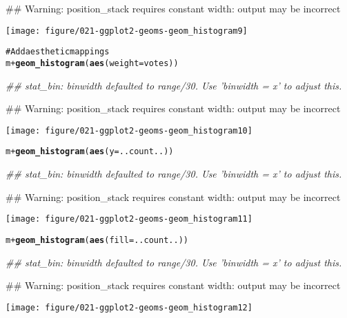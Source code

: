\documentclass[a4paper,titlepage]{tufte-handout}\usepackage{graphicx, color}
\makeatletter
\def\maxwidth{ %
  \ifdim\Gin@nat@width>\linewidth
    \linewidth
  \else
    \Gin@nat@width
  \fi
}
\newcommand{\hlfunctioncall}[1]{\textcolor[rgb]{0.501960784313725,0,0.329411764705882}{\textbf{#1}}}%
\newcommand{\hlcomment}[1]{\textcolor[rgb]{0.180392156862745,0.6,0.341176470588235}{#1}}%
\newenvironment{kframe}{%
 \def\at@end@of@kframe{}%
 \ifinner\ifhmode%
  \def\at@end@of@kframe{\end{minipage}}%
  \begin{minipage}{\columnwidth}%
 \fi\fi%
 \def\FrameCommand##1{\hskip\@totalleftmargin \hskip-\fboxsep
 \colorbox{shadecolor}{##1}\hskip-\fboxsep
     \hskip-\linewidth \hskip-\@totalleftmargin \hskip\columnwidth}%
 \MakeFramed {\advance\hsize-\width
   \@totalleftmargin\z@ \linewidth\hsize
   \@setminipage}}%
 {\par\unskip\endMakeFramed%
 \at@end@of@kframe}
\newenvironment{knitrout}{}{} %
\makeatother
\begin{document}
\begin{knitrout}
\begin{kframe}
{\ttfamily\noindent\textcolor{warningcolor}{\#\# Warning: position\_stack requires constant width: output may be incorrect}}\end{kframe}
\texttt{[image: figure/021-ggplot2-geoms-geom\_histogram9]} 
\begin{kframe}\begin{alltt}

\hlcomment{# Add aesthetic mappings}
m + \hlfunctioncall{geom_histogram}(\hlfunctioncall{aes}(weight = votes))
\end{alltt}


{\ttfamily\noindent\itshape\textcolor{messagecolor}{\#\# stat\_bin: binwidth defaulted to range/30. Use 'binwidth = x' to adjust this.}}

{\ttfamily\noindent\textcolor{warningcolor}{\#\# Warning: position\_stack requires constant width: output may be incorrect}}\end{kframe}
\texttt{[image: figure/021-ggplot2-geoms-geom\_histogram10]} 
\begin{kframe}\begin{alltt}
m + \hlfunctioncall{geom_histogram}(\hlfunctioncall{aes}(y = ..count..))
\end{alltt}


{\ttfamily\noindent\itshape\textcolor{messagecolor}{\#\# stat\_bin: binwidth defaulted to range/30. Use 'binwidth = x' to adjust this.}}

{\ttfamily\noindent\textcolor{warningcolor}{\#\# Warning: position\_stack requires constant width: output may be incorrect}}\end{kframe}
\texttt{[image: figure/021-ggplot2-geoms-geom\_histogram11]} 
\begin{kframe}\begin{alltt}
m + \hlfunctioncall{geom_histogram}(\hlfunctioncall{aes}(fill = ..count..))
\end{alltt}


{\ttfamily\noindent\itshape\textcolor{messagecolor}{\#\# stat\_bin: binwidth defaulted to range/30. Use 'binwidth = x' to adjust this.}}

{\ttfamily\noindent\textcolor{warningcolor}{\#\# Warning: position\_stack requires constant width: output may be incorrect}}\end{kframe}
\texttt{[image: figure/021-ggplot2-geoms-geom\_histogram12]} 
\begin{kframe}\begin{alltt}


\end{alltt}
\end{kframe}
\end{knitrout}
\end{document}
